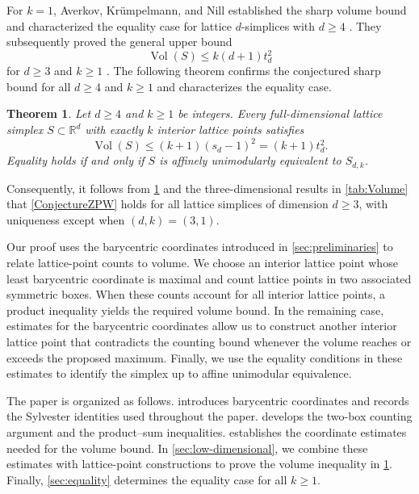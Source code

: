 \documentclass[reqno, 11pt]{article}
\numberwithin{equation}{section}
\newtheorem{theorem}{Theorem}[section]
\theoremstyle{definition}
\newcommand{\R}{\mathbb R}
\begin{document}
For $k=1$, Averkov, Kr\"umpelmann, and Nill established the sharp volume bound and characterized the equality case for lattice $d$-simplices with $d\ge4$ \cite[Theorem~2.2]{AKN}. They subsequently proved the general upper bound
\[
\operatorname{Vol}(S)\le k(d+1)t_d^2
\]
for $d\ge3$ and $k\ge1$ \cite[Theorem~1.2]{AKN2020}. The following theorem confirms the conjectured sharp bound for all $d\ge4$ and $k\ge1$ and characterizes the equality case.


\begin{theorem}\label{main:theorem}
Let $d\ge4$ and $k\ge1$ be integers. Every full-dimensional lattice simplex
$S\subset\R^d$ with exactly $k$ interior lattice points satisfies
\[
 \operatorname{Vol}(S)\le(k+1)(s_d-1)^2=(k+1)t_d^2.
\]
Equality holds if and only if $S$ is affinely unimodularly equivalent to
$S_{d,k}$.
\end{theorem}

Consequently, it follows from \cref{main:theorem} and the three-dimensional results in \cref{tab:Volume} that \cref{ConjectureZPW} holds for all lattice simplices of dimension $d\geq3$, with uniqueness except when $(d,k)=(3,1)$.


Our proof uses the barycentric coordinates introduced in
\cref{sec:preliminaries} to relate lattice-point counts to volume.
We choose an interior lattice point whose least barycentric coordinate
is maximal and count lattice points in two associated symmetric boxes.
When these counts account for all interior lattice points, a product
inequality yields the required volume bound. In the remaining case,
estimates for the barycentric coordinates allow us to construct another
interior lattice point that contradicts the counting bound whenever the
volume reaches or exceeds the proposed maximum. Finally, we use the
equality conditions in these estimates to identify the simplex up to
affine unimodular equivalence.

The paper is organized as follows.  introduces
barycentric coordinates and records the Sylvester identities used
throughout the paper.  develops the two-box counting
argument and the product--sum inequalities. 
establishes the coordinate estimates needed for the volume bound.
In \cref{sec:low-dimensional}, we combine these estimates with
lattice-point constructions to prove the volume inequality in
\cref{main:theorem}. Finally, \cref{sec:equality} determines the equality
case for all $k\geq1$.
\end{document}

